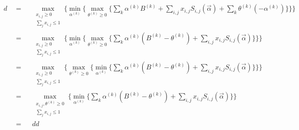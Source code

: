 \documentclass[sigconf]{acmart}
\newcommand{\sumj}{\sum\limits_j}
\newcommand{\sumk}{\sum\limits_k}
\newcommand{\sumij}{\sum\limits_{i,j}}
\newcommand{\sx}{x_{i,j}}
\newcommand{\sB}{B^{(k)}}
\newcommand{\salpha}{\alpha^{(k)}}
\newcommand{\stheta}{\theta^{(k)}}
\newcommand{\sS}{S_{i,j}}
\newcommand{\valpha}{\vec{\alpha}}
\newcommand{\assignmentconstraint}{\sumj \sx \le 1}
\begin{document}
\begin{align*}
    d     & = &&
        \max\limits_{\substack{ \sx \ge 0 \\ \assignmentconstraint }} \{
        \min\limits_{\salpha} \{ \max\limits_{\stheta \ge 0} \{
        \sumk \salpha \sB + \sumij \sx \sS(\valpha) + \sumk \stheta (-\salpha)\} \} \}\\
    \quad & = &&
        \max\limits_{\substack{ \sx \ge 0 \\ \assignmentconstraint }} \{
        \min\limits_{\salpha} \{ \max\limits_{\stheta \ge 0} \{
        \sumk \salpha (\sB - \stheta) + \sumij \sx \sS(\valpha) \} \} \}\\
    \quad & = &&
        \max\limits_{\substack{ \sx \ge 0 \\ \assignmentconstraint }} \{
        \max\limits_{\stheta \ge 0} \{ \min\limits_{\salpha} \{
        \sumk \salpha (\sB - \stheta) + \sumij \sx \sS(\valpha) \} \} \}\\
    \quad & = &&
        \max\limits_{\substack{ \sx,\stheta \ge 0 \\ \assignmentconstraint }} \{
        \min\limits_{\salpha} \{
        \sumk \salpha (\sB - \stheta) + \sumij \sx \sS(\valpha) \} \}\\
    \quad & = && dd
\end{align*}



\end{document}

